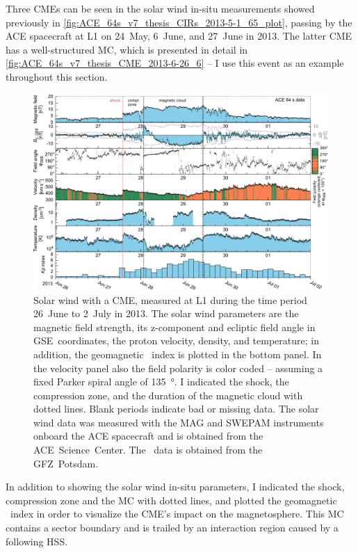 Three CMEs can be seen in the solar wind in-situ measurements showed previously in \autoref{fig:ACE_64s_v7_thesis_CIRs_2013-5-1_65_plot}, passing by the ACE spacecraft at L1 on 24~May, 6~June, and 27~June in 2013. The latter CME has a well-structured MC, which is presented in detail in \autoref{fig:ACE_64s_v7_thesis_CME_2013-6-26_6} -- I use this event as an example throughout this section.
\begin{figure}[htb]
	\centering
	\includegraphics[width=\textwidth]{figures_of_mine/gnuplots/ACE_64s_v7_thesis_CME_2013-6-26_6.pdf}
	\caption[]
	{Solar wind with a CME, measured at L1 during the time period 26~June to 2~July in 2013. The solar wind parameters are the magnetic field strength, its z-component and ecliptic field angle in GSE~coordinates, the proton velocity, density, and temperature; in addition, the geomagnetic \Kp~index is plotted in the bottom panel. In the velocity panel also the field polarity is color coded -- assuming a fixed Parker spiral angle of \SI{135}{\degree}. I indicated the shock, the compression zone, and the duration of the magnetic cloud with dotted lines. Blank periods indicate bad or missing data. The solar wind data was measured with the MAG and SWEPAM instruments onboard the ACE spacecraft and is obtained from the ACE~Science~Center. The \Kp{}~data is obtained from the GFZ~Potsdam.}
	\label{fig:ACE_64s_v7_thesis_CME_2013-6-26_6}
\end{figure}
In addition to showing the solar wind in-situ parameters, I indicated the shock, compression zone and the MC with dotted lines, and plotted the geomagnetic \Kp{}~index in order to visualize the CME's impact on the magnetosphere. This MC contains a sector boundary and is trailed by an interaction region caused by a following HSS.

